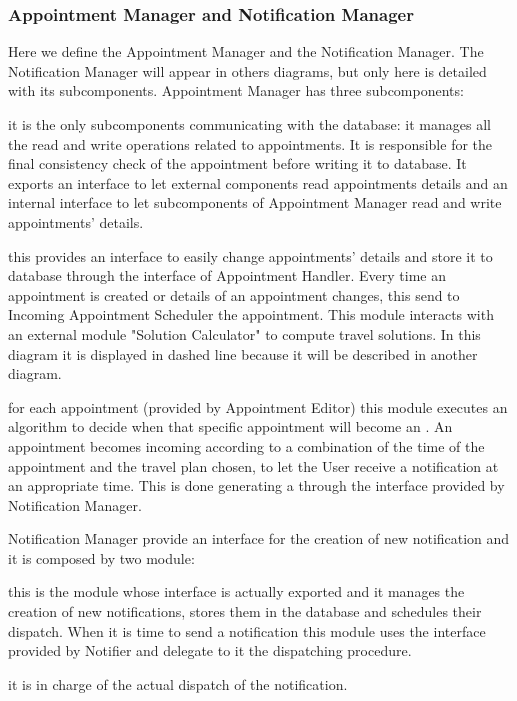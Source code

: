 	\subsubsection{Appointment Manager and Notification Manager}
		\label{sect:AppointmentManager}
		\label{sect:NotificationManager}
		Here we define the Appointment Manager and the Notification Manager. The Notification Manager will appear in others diagrams, but only here is detailed with its subcomponents. 
		\medskip\newline
		Appointment Manager has three subcomponents:		
		\begin{description}[before={\renewcommand{\makelabel}[1]{-- \textit{##1}:}}]
			\item[Appointment Handler] it is the only subcomponents communicating with the database: it manages all the read and write operations related to appointments. It is responsible for the final consistency check of the appointment before writing it to database. It exports an interface to let external components read appointments details and an internal interface to let subcomponents of Appointment Manager read and write appointments' details.
			\item[Appointment Editor] this provides an interface to easily change appointments' details and store it to database through the interface of Appointment Handler. Every time an appointment is created or details of an appointment changes, this send to Incoming Appointment Scheduler the appointment. This module interacts with an external module "Solution Calculator" to compute travel solutions. In this diagram it is displayed in dashed line because it will be described in another diagram.
			\item[Incoming Appointment Scheduler] for each appointment (provided by Appointment Editor) this module executes an algorithm to decide when that specific appointment will become an . An appointment becomes incoming according to a combination of the time of the appointment and the travel plan chosen, to let the User receive a notification at an appropriate time. This is done generating a  through the interface provided by Notification Manager.
		\end{description}
		\bigskip
		Notification Manager provide an interface for the creation of new notification and it is composed by two module:
		\begin{description}[before={\renewcommand{\makelabel}[1]{-- \textit{##1}:}}]
			\item[Notification Scheduler] this is the module whose interface is actually exported and it manages the creation of new notifications, stores them in the database and schedules their dispatch. When it is time to send a notification this module uses the interface provided by Notifier and delegate to it the dispatching procedure.
			\item[Notifier] it is in charge of the actual dispatch of the notification.
		\end{description}
		
